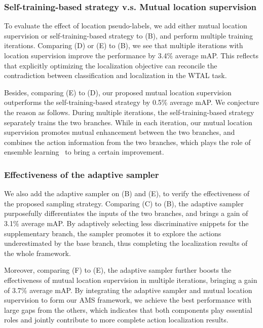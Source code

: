 \documentclass[journal]{IEEEtran}
\begin{document}
\subsubsection{Self-training-based strategy v.s. Mutual location supervision}
To evaluate the effect of location pseudo-labels, we add either mutual location supervision or self-training-based strategy to (B), and perform multiple training iterations. Comparing (D) or (E) to (B), we see that multiple iterations with location supervision improve the performance by 3.4\% average mAP. This reflects that explicitly optimizing the localization objective can reconcile the contradiction between classification and localization in the WTAL task.


Besides, comparing (E) to (D), our proposed mutual location supervision outperforms the self-training-based strategy by 0.5\% average mAP. We conjecture the reason as follows. During multiple iterations, the self-training-based strategy separately trains the two branches. While in each iteration, our mutual location supervision promotes mutual enhancement between the two branches, and combines the action information from the two branches, which plays the role of ensemble learning~\cite{polikar2012ensemble,zhou2009ensemble,dietterich2002ensemble} to bring a certain improvement.



\subsubsection{Effectiveness of the adaptive sampler}
We also add the adaptive sampler on (B) and (E), to verify the effectiveness of the proposed sampling strategy. Comparing (C) to (B), the adaptive sampler purposefully differentiates the inputs of the two branches, and brings a gain of 3.1\% average mAP. By adaptively selecting less discriminative snippets for the supplementary branch, the sampler promotes it to explore the actions underestimated by the base branch, thus completing the localization results of the whole framework. 


Moreover, comparing (F) to (E), the adaptive sampler further boosts the effectiveness of mutual location supervision in multiple iterations, bringing a gain of 3.7\% average mAP. By integrating the adaptive sampler and mutual location supervision to form our AMS framework, we achieve the best performance with large gaps from the others, which indicates that both components play essential roles and jointly contribute to more complete action localization results. 
\end{document}
